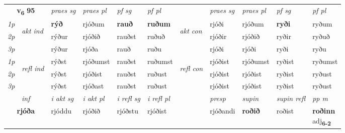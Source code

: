 \noindent
\begin{tabular}{lllllllllll} \toprule
\multicolumn{2}{c}{\textbf{v{\textsubscript{6}}} \Large{\textbf{95}}}  &  \textit{praes sg}  & \textit{praes pl}  &\textit{ pf sg} & \textit{pf pl} &  &  \textit{praes sg}  & \textit{praes pl}  & \textit{pf sg} & \textit{pf pl } \\*
	\cmidrule{3-6} \cmidrule{8-11}
 {\textit{1p}} & \multirow{3}{*}{\begin{turn}{90}\textit{akt ind}\end{turn}} & \textbf{rýð} & rjóðum & \textbf{rauð} & \textbf{ruðum} & \multirow{3}{*}{\begin{turn}{90}\textit{akt con}\end{turn}} &rjóði & rjóðum & \textbf{ryði} & ryðum\\*
 {\textit{2p}} &  &  rýður  & rjóðið & rauðst & ruðuð & & rjóðir & rjóðið & ryðir & ryðuð \\*
{\textit{3p}} &  & rýður & rjóða & rauð & ruðu & & rjóði & rjóði& ryði & ryðu \\*
\cmidrule{3-6} \cmidrule{8-11}
 {\textit{1p}} & \multirow{3}{*}{\begin{turn}{90}\textit{refl ind}\end{turn}}  & rýðst & rjóðumst & rauðst & ruðumst & \multirow{3}{*}{\begin{turn}{90}\textit{refl con}\end{turn}}  &rjóðist & rjóðumst & ryðist & ryðumst \\*
 {\textit{2p}} &  & rýðst & rjóðist & rauðst & ruðust & &rjóðist & rjóðist & ryðist & ryðust \\*
 {\textit{3p}}  & & rýðst & rjóðast & rauðst & ruðust & & rjóðist & rjóðist& ryðist & ryðust \\*
\cmidrule{3-6} \cmidrule{8-11}

   \multicolumn{2}{c}{\textit{inf}}  & \textit{i akt sg} & \textit{i akt pl} & \textit{i refl sg} & \textit{i refl pl} && \textit{presp} & \textit{supin} & \textit{supin refl} & \textit{pp m} \\*
  \multicolumn{2}{c}{\textbf{rjóða}} & rjóddu  & rjóðið & rjóðstu & rjóðist && rjóðandi &  \textbf{roðið} & roðist & \specialcell{\textbf{roðinn} \\ adj\textbf{\textsubscript{6-2}}} \\*
\end{tabular}

